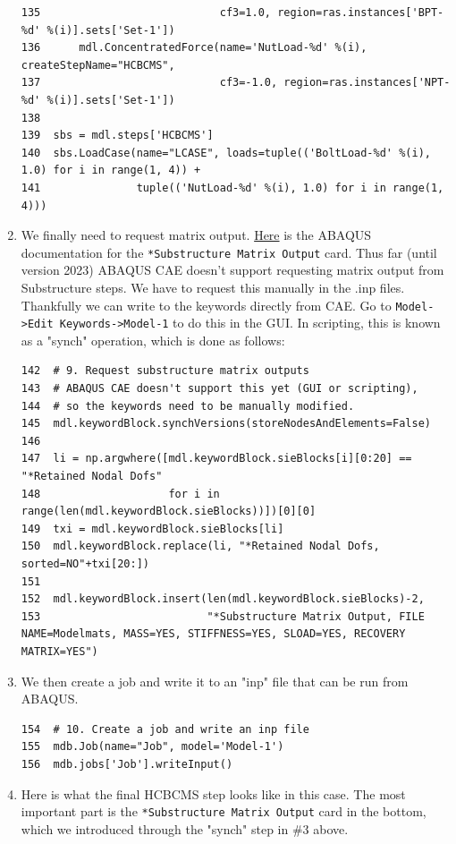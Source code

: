 \documentclass[11pt]{article}
\begin{document}
\begin{enumerate}
\begin{verbatim}
135                            cf3=1.0, region=ras.instances['BPT-%d' %(i)].sets['Set-1'])
136      mdl.ConcentratedForce(name='NutLoad-%d' %(i), createStepName="HCBCMS",
137                            cf3=-1.0, region=ras.instances['NPT-%d' %(i)].sets['Set-1'])
138  
139  sbs = mdl.steps['HCBCMS']
140  sbs.LoadCase(name="LCASE", loads=tuple(('BoltLoad-%d' %(i), 1.0) for i in range(1, 4)) +
141               tuple(('NutLoad-%d' %(i), 1.0) for i in range(1, 4)))
\end{verbatim}
\item We finally need to request matrix output.
\href{https://classes.engineering.wustl.edu/2009/spring/mase5513/abaqus/docs/v6.6/books/key/default.htm?startat=ch18abk43.html}{Here} is the ABAQUS documentation for the \texttt{*Substructure Matrix Output} card.
Thus far (until version 2023) ABAQUS CAE doesn't support requesting matrix output from Substructure steps.
We have to request this manually in the .inp files.
Thankfully we can write to the keywords directly from CAE.
Go to \texttt{Model->Edit Keywords->Model-1} to do this in the GUI.
In scripting, this is known as a "synch" operation, which is done as follows:
\begin{verbatim}
142  # 9. Request substructure matrix outputs
143  # ABAQUS CAE doesn't support this yet (GUI or scripting),
144  # so the keywords need to be manually modified.
145  mdl.keywordBlock.synchVersions(storeNodesAndElements=False)
146  
147  li = np.argwhere([mdl.keywordBlock.sieBlocks[i][0:20] == "*Retained Nodal Dofs"
148                    for i in range(len(mdl.keywordBlock.sieBlocks))])[0][0]
149  txi = mdl.keywordBlock.sieBlocks[li]
150  mdl.keywordBlock.replace(li, "*Retained Nodal Dofs, sorted=NO"+txi[20:])
151  
152  mdl.keywordBlock.insert(len(mdl.keywordBlock.sieBlocks)-2, 
153                          "*Substructure Matrix Output, FILE NAME=Modelmats, MASS=YES, STIFFNESS=YES, SLOAD=YES, RECOVERY MATRIX=YES")
\end{verbatim}
\item We then create a job and write it to an "inp" file that can be run from ABAQUS.
\begin{verbatim}
154  # 10. Create a job and write an inp file
155  mdb.Job(name="Job", model='Model-1')
156  mdb.jobs['Job'].writeInput()
\end{verbatim}
\item Here is what the final HCBCMS step looks like in this case.
The most important part is the \texttt{*Substructure Matrix Output} card in the bottom,
which we introduced through the "synch" step in \#3 above.

\end{enumerate}
\end{document}
